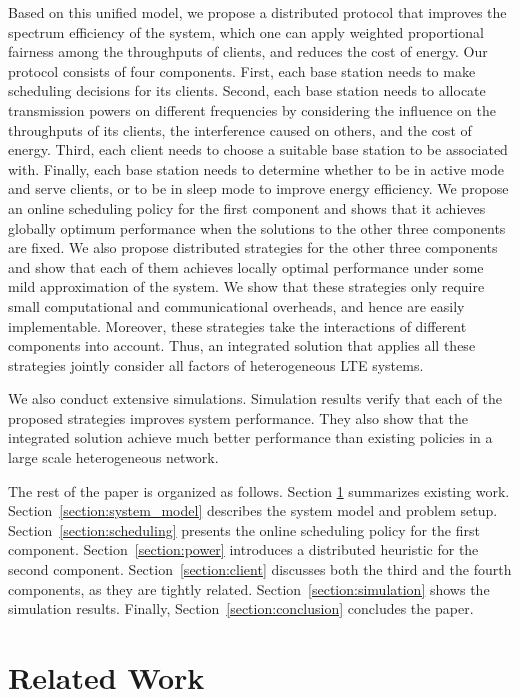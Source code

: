 \documentclass[conference]{IEEEtran}
\begin{document}
Based on this unified model, we propose a distributed protocol that improves the spectrum efficiency of the system, which one can
apply weighted proportional fairness among the throughputs of clients, and reduces the cost of energy. Our protocol consists of four components. First, each base station needs to make scheduling decisions for its clients. Second, each base station needs to allocate transmission powers on different frequencies by considering the influence on the throughputs of its clients, the interference caused on others, and the cost of energy. Third, each client needs to choose a suitable base station to be associated with. Finally, each base station needs to determine whether to be in active mode and serve clients, or to be in sleep mode to improve energy efficiency. We propose an online scheduling policy for the first component and shows that it achieves globally optimum performance when the solutions to the other three components are fixed. We also propose distributed strategies for the other three components and show that each of them achieves locally optimal performance under some mild approximation of the system. We show that these strategies only require small computational and communicational overheads, and hence are easily implementable. Moreover, these strategies take the interactions of different components into account. Thus, an integrated solution that applies all these strategies jointly consider all factors of heterogeneous LTE systems.

We also conduct extensive simulations. Simulation results verify that each of the proposed strategies improves system performance. They also show that the integrated solution achieve much better performance than existing policies in a large scale heterogeneous network.

The rest of the paper is organized as follows. Section \ref{section:related} summarizes existing work. Section~\ref{section:system_model} describes the system model and problem setup. Section~\ref{section:scheduling} presents the online scheduling policy for the first component.
Section~\ref{section:power} introduces a distributed heuristic for the second component.
Section~\ref{section:client} discusses both the third and the fourth components, as they are tightly related.
Section~\ref{section:simulation} shows the simulation results.
Finally, Section~\ref{section:conclusion} concludes the paper.

\section{Related Work}	\label{section:related}
\end{document}
